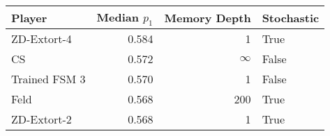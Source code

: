 \begin{tabular}{lrrl}
\toprule
        Player &  Median $p_1$ &  Memory Depth & Stochastic \\
\midrule
   ZD-Extort-4 &         0.584 &             1 &       True \\
            CS &         0.572 &            \(\infty\) &      False \\
 Trained FSM 3 &         0.570 &             1 &      False \\
          Feld &         0.568 &           200 &       True \\
   ZD-Extort-2 &         0.568 &             1 &       True \\
\bottomrule
\end{tabular}
